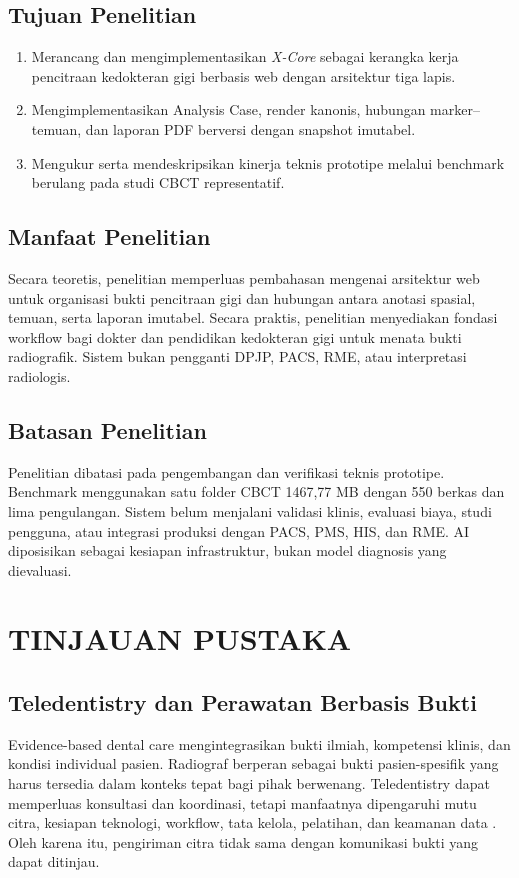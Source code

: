 \documentclass[12pt,a4paper,oneside]{report}
\newcommand{\xcore}{\textit{X-Core}}
\begin{document}
\section{Tujuan Penelitian}
\begin{enumerate}[label=\arabic*.]
\item Merancang dan mengimplementasikan \xcore{} sebagai kerangka kerja pencitraan kedokteran gigi berbasis web dengan arsitektur tiga lapis.
\item Mengimplementasikan Analysis Case, render kanonis, hubungan marker--temuan, dan laporan PDF berversi dengan snapshot imutabel.
\item Mengukur serta mendeskripsikan kinerja teknis prototipe melalui benchmark berulang pada studi CBCT representatif.
\end{enumerate}

\section{Manfaat Penelitian}
Secara teoretis, penelitian memperluas pembahasan mengenai arsitektur web untuk organisasi bukti pencitraan gigi dan hubungan antara anotasi spasial, temuan, serta laporan imutabel. Secara praktis, penelitian menyediakan fondasi workflow bagi dokter dan pendidikan kedokteran gigi untuk menata bukti radiografik. Sistem bukan pengganti DPJP, PACS, RME, atau interpretasi radiologis.

\section{Batasan Penelitian}
Penelitian dibatasi pada pengembangan dan verifikasi teknis prototipe. Benchmark menggunakan satu folder CBCT 1467,77 MB dengan 550 berkas dan lima pengulangan. Sistem belum menjalani validasi klinis, evaluasi biaya, studi pengguna, atau integrasi produksi dengan PACS, PMS, HIS, dan RME. AI diposisikan sebagai kesiapan infrastruktur, bukan model diagnosis yang dievaluasi.

\chapter{TINJAUAN PUSTAKA}
\label{bab:tinjauan-lengkap}
\section{Teledentistry dan Perawatan Berbasis Bukti}
Evidence-based dental care mengintegrasikan bukti ilmiah, kompetensi klinis, dan kondisi individual pasien. Radiograf berperan sebagai bukti pasien-spesifik yang harus tersedia dalam konteks tepat bagi pihak berwenang. Teledentistry dapat memperluas konsultasi dan koordinasi, tetapi manfaatnya dipengaruhi mutu citra, kesiapan teknologi, workflow, tata kelola, pelatihan, dan keamanan data \cite{ref:talla2024,ref:fahim2022,ref:soegyanto2022}. Oleh karena itu, pengiriman citra tidak sama dengan komunikasi bukti yang dapat ditinjau.
\end{document}
